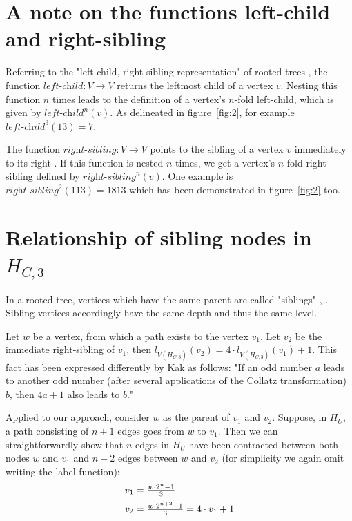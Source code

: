 \section{A note on the functions left-child and right-sibling}
Referring to the "left-child, right-sibling representation" of rooted trees \cite[p.~246]{Ref_Cormen_Leiserson_Rivest_Stein}, the function $\textit{left-child}:V\rightarrow V$ returns the leftmost child of a vertex $v$. Nesting this function $n$ times leads to the definition of a vertex's $n$-fold left-child, which is given by $\textit{left-child}^n(v)$. As delineated in figure~\ref{fig:2}, for example $\textit{left-child}^3(13)=7$.

The function $\textit{right-sibling}:V\rightarrow V$ points to the sibling of a vertex $v$ immediately to its right \cite[p.~246]{Ref_Cormen_Leiserson_Rivest_Stein}. If this function is nested $n$ times, we get a vertex's $n$-fold right-sibling defined by $\textit{right-sibling}^n(v)$. One example is $\textit{right-sibling}^2(113)=1813$ which has been demonstrated in figure~\ref{fig:2} too.

\section{\texorpdfstring{Relationship of sibling nodes in $H_{C,3}$}{Relationship of sibling nodes in HC3}}
\label{sec:relationship_sibling_nodes_k3}

In a rooted tree, vertices which have the same parent are called "siblings" \cite[p.~702]{Ref_Johnsonbaugh}, \cite[p.~747]{Ref_Rosen}. Sibling vertices accordingly have the same depth and thus the same level.

Let $w$ be a vertex, from which a path exists to the vertex $v_1$. Let $v_2$ be the immediate right-sibling of $v_1$, then $l_{V\left(H_{C,3}\right)}\left(v_2\right)=4\cdot l_{V\left(H_{C,3}\right)}\left(v_1\right)+1$. This fact has been expressed differently by Kak \cite{Ref_Kak_2014} as follows: "If an odd number $a$ leads to another odd number (after several applications of the Collatz transformation) $b$, then $4a+1$ also leads to $b$."

Applied to our approach, consider $w$ as the parent of $v_1$ and $v_2$. Suppose, in $H_U$, a path consisting of $n+1$ edges goes from $w$ to $v_1$. Then we can straightforwardly show that $n$ edges in $H_U$ have been contracted between both nodes $w$ and $v_1$ and $n+2$ edges between $w$ and $v_2$ (for simplicity we again omit writing the label function):
\begin{equation}
\label{eq:next_sibling_k3}
\begin{array}{l}
		v_1=\frac{w\cdot2^n-1}{3}
		\\[\medskipamount]
		v_2=\frac{w\cdot2^{n+2}-1}{3}=4\cdot v_1+1
\end{array}
\end{equation}

